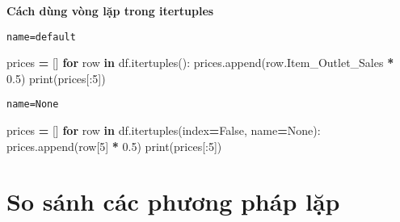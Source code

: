 \documentclass[
]{book}
\newenvironment{Shaded}{\begin{snugshade}}{\end{snugshade}}
\newcommand{\BuiltInTok}[1]{#1}
\newcommand{\ControlFlowTok}[1]{\textcolor[rgb]{0.13,0.29,0.53}{\textbf{#1}}}
\newcommand{\DecValTok}[1]{\textcolor[rgb]{0.00,0.00,0.81}{#1}}
\newcommand{\FloatTok}[1]{\textcolor[rgb]{0.00,0.00,0.81}{#1}}
\newcommand{\KeywordTok}[1]{\textcolor[rgb]{0.13,0.29,0.53}{\textbf{#1}}}
\newcommand{\NormalTok}[1]{#1}
\newcommand{\OperatorTok}[1]{\textcolor[rgb]{0.81,0.36,0.00}{\textbf{#1}}}
\newcommand{\VariableTok}[1]{\textcolor[rgb]{0.00,0.00,0.00}{#1}}
\begin{document}
\textbf{Cách dùng vòng lặp trong itertuples}

\texttt{name=default}

\begin{Shaded}
\begin{Highlighting}[]
\NormalTok{prices }\OperatorTok{=}\NormalTok{ []}
\ControlFlowTok{for}\NormalTok{ row }\KeywordTok{in}\NormalTok{ df.itertuples():}
\NormalTok{    prices.append(row.Item\_Outlet\_Sales }\OperatorTok{*} \FloatTok{0.5}\NormalTok{)}
\BuiltInTok{print}\NormalTok{(prices[:}\DecValTok{5}\NormalTok{])}
\end{Highlighting}
\end{Shaded}

\texttt{name=None}

\begin{Shaded}
\begin{Highlighting}[]
\NormalTok{prices }\OperatorTok{=}\NormalTok{ []}
\ControlFlowTok{for}\NormalTok{ row }\KeywordTok{in}\NormalTok{ df.itertuples(index}\OperatorTok{=}\VariableTok{False}\NormalTok{, name}\OperatorTok{=}\VariableTok{None}\NormalTok{):}
\NormalTok{    prices.append(row[}\DecValTok{5}\NormalTok{] }\OperatorTok{*} \FloatTok{0.5}\NormalTok{)}
\BuiltInTok{print}\NormalTok{(prices[:}\DecValTok{5}\NormalTok{])}
\end{Highlighting}
\end{Shaded}

\section{So sánh các phương pháp lặp}\label{so-suxe1nh-cuxe1c-phux1b0ux1a1ng-phuxe1p-lux1eb7p}
\end{document}
